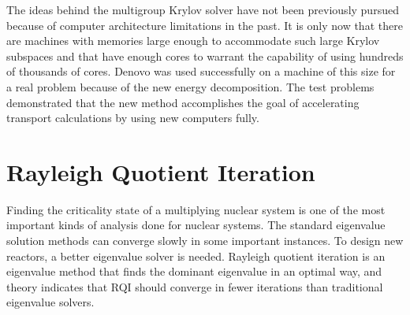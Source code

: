 


The ideas behind the multigroup Krylov solver have not been previously pursued because of computer architecture limitations in the past. It is only now that there are machines with memories large enough to accommodate such large Krylov subspaces and that have enough cores to warrant the capability of using hundreds of thousands of cores. Denovo was used successfully on a machine of this size for a real problem because of the new energy decomposition. The test problems demonstrated that the new method accomplishes the goal of accelerating transport calculations by using new computers fully.

\section{Rayleigh Quotient Iteration}
Finding the criticality state of a multiplying nuclear system is one of the most important kinds of analysis done for nuclear systems. The standard eigenvalue solution methods can converge slowly in some important instances. To design new reactors, a better eigenvalue solver is needed. Rayleigh quotient iteration is an eigenvalue method that finds the dominant eigenvalue in an optimal way, and theory indicates that RQI should converge in fewer iterations than traditional eigenvalue solvers.

